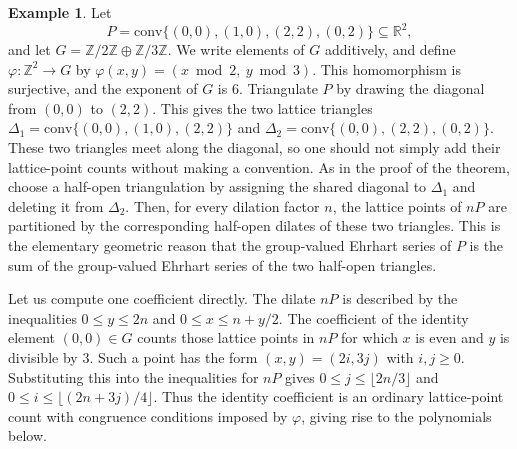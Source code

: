 \documentclass[12pt,reqno]{amsart}
\theoremstyle{definition}
\newtheorem{exam}[thm]{Example}
\theoremstyle{remark}
\begin{document}
\begin{exam}\label{exam:quasipolynomial}
Let \[
P=\text{conv}\{(0,0),(1,0),(2,2),(0,2)\}\subseteq \mathbb R^2,\] and let $G=\mathbb Z/2\mathbb Z\oplus \mathbb Z/3\mathbb Z$. We write elements of $G$ additively, and define $\varphi:\mathbb Z^2\to G$ by $\varphi(x,y)=(x \bmod 2,\ y \bmod 3)$. This homomorphism is surjective, and the exponent of $G$ is $6$. Triangulate $P$ by drawing the diagonal from $(0,0)$ to $(2,2)$. This gives the two lattice triangles $\Delta_1=\text{conv}\{(0,0),(1,0),(2,2)\}$ and $\Delta_2=\text{conv}\{(0,0),(2,2),(0,2)\}$. These two triangles meet along the diagonal, so one should not simply add their lattice-point counts without making a convention. As in the proof of the theorem, choose a half-open triangulation by assigning the shared diagonal to $\Delta_1$ and deleting it from $\Delta_2$. Then, for every dilation factor $n$, the lattice points of $nP$ are partitioned by the corresponding half-open dilates of these two triangles. This is the elementary geometric reason that the group-valued Ehrhart series of $P$ is the sum of the group-valued Ehrhart series of the two half-open triangles.

Let us compute one coefficient directly. The dilate $nP$ is described by the inequalities $0\leq y\leq 2n$ and $0\leq x\leq n+y/2$. The coefficient of the identity element $(0,0)\in G$ counts those lattice points in $nP$ for which $x$ is even and $y$ is divisible by $3$. Such a point has the form $(x,y)=(2i,3j)$ with $i,j\geq 0$. Substituting this into the inequalities for $nP$ gives $0\leq j\leq \lfloor 2n/3\rfloor$ and $0\leq i\leq \lfloor (2n+3j)/4\rfloor$. Thus the identity coefficient is an ordinary lattice-point count with congruence conditions imposed by $\varphi$, giving rise to the polynomials below.


\end{exam}
\end{document}
